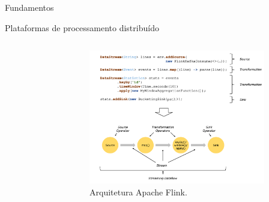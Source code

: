 \documentclass[aspectratio=1610,10pt]{beamer}
\newcommand{\nota}[1]{\hspace*{-0.5cm}\textit{{\color[rgb]{1,0,0}Nota: #1}}}
\begin{document}
\begin{frame}[fragile]{Fundamentos}
\begin{alertblock}{Plataformas de processamento distribuído}
\begin{columns}[T,onlytextwidth]
\begin{figure}
        \end{figure}
        \begin{figure}
            \includegraphics[width=0.9\textwidth, trim={0 0 10cm 20cm},clip]{figuras/dataflow-code-flink.png}
            \caption{Arquitetura Apache Flink.}
        \end{figure}
    \end{columns}
  \end{alertblock}



\end{frame}
\end{document}
